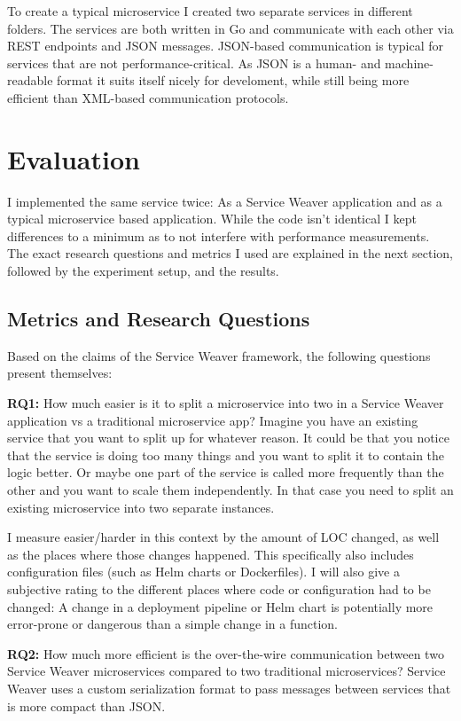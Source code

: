\documentclass[sigconf,review,9pt]{acmart}
\begin{document}
To create a typical microservice I created two separate services in different folders.
The services are both written in Go and communicate with each other via REST endpoints
and JSON messages.
JSON-based communication is typical for services that are not performance-critical.
As JSON is a human- and machine-readable format it suits itself nicely for develoment,
while still being more efficient than XML-based communication protocols.

\section{Evaluation}

I implemented the same service twice: As a Service Weaver application and as a typical
microservice based application.
While the code isn't identical I kept differences to a minimum as to not interfere
with performance measurements.
The exact research questions and metrics I used are explained in the next section,
followed by the experiment setup, and the results.

\subsection{Metrics and Research Questions}
Based on the claims of the Service Weaver framework, the following questions
present themselves:

\textbf{RQ1:} How much easier is it to split a microservice into two in a Service Weaver
application vs a traditional microservice app?
Imagine you have an existing service that you want to split up for whatever
reason.
It could be that you notice that the service is doing too many things
and you want to split it to contain the logic better.
Or maybe one part of the service is called more frequently than the other
and you want to scale them independently.
In that case you need to split an existing microservice into two separate
instances.

I measure easier/harder in this context by the amount of LOC changed, as well
as the places where those changes happened.
This specifically also includes configuration files (such as Helm charts or Dockerfiles).
I will also give a subjective rating to the different places where code
or configuration had to be changed: A change in a deployment pipeline
or Helm chart is potentially more error-prone or dangerous than a simple
change in a function.

\textbf{RQ2:} How much more efficient is the over-the-wire communication between two Service Weaver
microservices compared to two traditional microservices?
Service Weaver uses a custom serialization format to pass messages between services
that is more compact than JSON.
\end{document}
